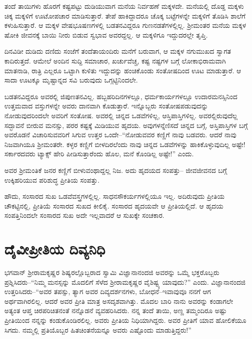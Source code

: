 ತಂದೆ ತಾಯಿಗಳು ಹೊರಗೆ ಕಷ್ಟಪಟ್ಟು ದುಡಿಯುವಾಗ ಮನೆಯ ನಿರ್ವಹಣೆ ಮಕ್ಕಳದೇ. ಮನೆಯಲ್ಲಿ ದೊಡ್ಡ ಮಕ್ಕಳು ಚಿಕ್ಕ ಮಕ್ಕಳಿಗೆ ಊಟೋಪಚಾರ ಮಾಡಿಸುತ್ತಾರೆ. ತೇಪೆ ಹಾಕಿದ್ದಾದರೂ ಚೊಕ್ಕ ಬಟ್ಟೆಗಳನ್ನೇ ಮಕ್ಕಳಿಗೆ ತೊಡಿಸಿ ಶಾಲೆಗೆ ಕಳುಹಿಸುತ್ತಾರೆ. ಆ ಮಕ್ಕಳ ವೇಷಭೂಷಣಗಳಲ್ಲಿ ಬಡತನವಿದ್ದರೂ ಗುಣನಡತೆಗಳಲ್ಲಿಲ್ಲ. ಶ‍್ರೀಮಂತರ ಮನೆಯ ಮಕ್ಕಳ ಷೋಕಿ ಜೀವನಕ್ಕೆ ಬಾಯಿ ನೀರು ಬಿಡುವ ಸ್ವಭಾವ ಅವರದ್ದಲ್ಲ. ಆ ಮಕ್ಕಳಿಗೂ ಇದ್ದುದರಲ್ಲೇ ತೃಪ್ತಿ.

ದಿನವಿಡೀ ದುಡಿದು ದಣಿದು ಸಂಜೆಗೆ ತಂದೆತಾಯಂದಿರು ಮನೆಗೆ ಬರುವಾಗ, ಆ ಮಕ್ಕಳ ನಗುಮುಖದ ಸ್ವಾಗತ ಕಾದಿರುತ್ತದೆ. ಆಮೇಲೆ ಅಂದಿನ ಸುದ್ದಿ ಸಮಾಚಾರ, ಖರ್ಚುವೆಚ್ಚ, ಕಷ್ಟ ನಷ್ಟಗಳ ಬಗ್ಗೆ ಲೋಕಾಭಿರಾಮವಾಗಿ ಮಾತನಾಡಿ, ರಾತ್ರಿ ಎಲ್ಲರೂ ಒಟ್ಟಾಗಿ ಕುಳಿತು ಇದ್ದುದನ್ನು ಹಂಚಿಕೊಂಡು ಸಂತೋಷದಿಂದ ಊಟ ಮಾಡುತ್ತಾರೆ. ಆ ಸಾದಾ ಊಟಕ್ಕೂ ಮೃಷ್ಟಾನ್ನದ ಸವಿ ಬರುವುದು ಒಗ್ಗಟ್ಟಿನಿಂದಲೇ.

ಬಡತನವಿದ್ದರೂ ಅವರಲ್ಲಿ ಜಿಪುಣತನವಿಲ್ಲ. ಹಬ್ಬಹರಿದಿನಗಳಲ್ಲೂ, ಧರ್ಮಕಾರ್ಯಗಳಲ್ಲೂ ಉದಾರಮನಸ್ಸಿನಿಂದ ಉತ್ತಮವಾದ ವಸ್ತುಗಳನ್ನೇ ಅವರು ದಾನವಾಗಿ ಕೊಡುತ್ತಾರೆ. ಇನ್ನೊಬ್ಬರು ಸಂತೋಷಪಡುವುದನ್ನು ನೋಡುವುದರಿಂದಲೇ ಅವರಿಗೆ ಸಂತೋಷ. ಅವರಲ್ಲಿ ಚಿನ್ನದ ಒಡವೆ\-ಗಳಿಲ್ಲ, ಆಸ್ತಿಪಾಸ್ತಿಗಳಿಲ್ಲ. ಅವರಲ್ಲಿರುವುದೆಲ್ಲ ಸದ್ಭಾವನೆ ಬೀರುವ ಮನಸ್ಸು, ಪರರ ಕಷ್ಟಕ್ಕೆ ಮಿಡಿಯುವ ಹೃದಯ. ಅವುಗಳನ್ನೆಣಿಸದೆ ಚಿನ್ನದ ಬಗ್ಗೆ, ಅಸ್ತಿಪಾಸ್ತಿಗಳ ಬಗ್ಗೆ ಅವರೊಡನೆ ವಿಚಾರಿಸುವವರಿಗೆ ಸಿಗುವ ಉತ್ತರ ಒಂದೇ–“ನೋಡುವವರ ಕಣ್ಣಿಗೆ ನಾವು ಬಡವರು. ಆದರೆ ನಾವು ನಿಜವಾಗಿಯೂ ಶ‍್ರೀಮಂತರೇ. ಕಳ್ಳರ ಕಣ್ಣಿಗೆ ಬೀಳದಿರಲೆಂದು ನಾವು ಚಿನ್ನದ ಒಡವೆಗಳನ್ನು ಹಾಕಿಕೊಳ್ಳುವುದಿಲ್ಲ ಅಷ್ಟೇ! ಸರ್ಕಾರದವರು ಟ್ಯಾಕ್ಸ್ ಹೇರಿ ಪೀಡಿಸುತ್ತಾರೆಂದು ಹೊಲ, ಮನೆ ಕೊಂಡಿಲ್ಲ ಅಷ್ಟೇ!” ಎಂದು.

ಅವರ ಶ‍್ರೀಮಂತಿಕೆ ಜನರ ಕಣ್ಣಿಗೆ ಬೀಳುವಂಥಾದ್ದಲ್ಲ ನಿಜ. ಅದು ಹೃದಯದ ಸಂಪತ್ತು– ಜೀವಜೀವನದ ಬಗ್ಗೆ ಉಕ್ಕಿಹರಿಯುವ ಪರಿಶುದ್ಧ ಪ್ರೀತಿಯ ಸಂಪತ್ತು.

ಹೌದು, ಸಂಸಾರದ ಸುಖ ಒಡವೆವಸ್ತ್ರಗಳಲ್ಲಿಲ್ಲ. ಸಾಧನಸೌಕರ್ಯಗಳಲ್ಲಿಯೂ ಇಲ್ಲ. ಅದಿರುವುದು ಪ್ರೀತಿಯ ಚೌಕಟ್ಟಿನಲ್ಲಿ, ಪ್ರೀತಿಯೆ ಸಂಸಾರದ ಸುಖದ ಕೀಲಿಕೈ. ಸಂಸಾರದ ಹೃದಯವೇ ಆ ಪ್ರೀತಿಯಲ್ಲಿದೆ. ಆ ಹೃದಯ ಸಂಪತ್ತಿನಿಂದಲೇ ಸಂಸಾರದ ಸುಖ ಅದೇ ಇಲ್ಲವಾದರೆ ಆ ಸುಖಕ್ಕೇ ಸಂಚಕಾರ.


\section*{ದೈವೀಪ್ರೀತಿಯ ದಿವ್ಯನಿಧಿ}


ಭಗವಾನ್ ಶ‍್ರೀರಾಮಕೃಷ್ಣರ ಶಿಷ್ಯರಲ್ಲೊಬ್ಬರಾದ ಸ್ವಾಮಿ ವಿಜ್ಞಾನಾನಂದಜಿ ಅವರನ್ನು ಒಮ್ಮೆ ಭಕ್ತರೊಬ್ಬರು ಪ್ರಶ್ನಿಸಿದರು–“ನಿಮ್ಮ ಮನಸ್ಸನ್ನು ಮೊದಲಿಗೆ ಸೆಳೆದ ಶ‍್ರೀರಾಮಕೃಷ್ಣರ ವೈಶಿಷ್ಟ್ಯ ಯಾವುದು?” ಎಂದು. ವಿಜ್ಞಾನಾನಂದಜಿ ಉತ್ತರಿಸಿದರು–“ಅವರ ತಪಸ್ಸು, ತ್ಯಾಗ ಅವರ ದಿವ್ಯದರ್ಶನಗಳು, ಬೋಧನೆ–ಇವಾವುವೂ ನನಗೆ ಆಗ ಅರ್ಥವಾಗಿರಲಿಲ್ಲ. ಆದರೆ ಅವರ ಪ್ರೀತಿ ಮಾತ್ರ ಅಸದೃಶವಾಗಿತ್ತು. ಮೊದಲ ಬಾರಿ ನಾನು ಅವರನ್ನು ಕಂಡಾಗಲೇ ಅತ್ಯಂತ ಆಪ್ತ ಚಿರಪರಿಚಿತನಂತೆ ನನ್ನೊಡನೆ ವ್ಯವಹರಿಸಿದರು. ನನ್ನ ತಂದೆ ತಾಯಿ, ಅಣ್ಣ ತಮ್ಮಂದಿರೂ ಅಷ್ಟು ಪ್ರೀತಿಯಿಂದ ನನ್ನನ್ನು ಕಂಡುಕೊಂಡಿರಲಿಲ್ಲ. ಅವರು ಪ್ರೀತಿಯ ನಿಧಿಯಾಗಿದ್ದರು. ಅವರ ಪ್ರೀತಿಗೆ ಯಾವ ಹೋಲಿಕೆಯೂ ಸಿಗದು. ನಮ್ಮಲ್ಲಿ ಪ್ರತಿಯೊಬ್ಬರ ಹಿತಚಿಂತನೆಯನ್ನೂ ಅವರು ಎಷ್ಟೊಂದು ಮಾಡುತ್ತಿದ್ದರು!”


